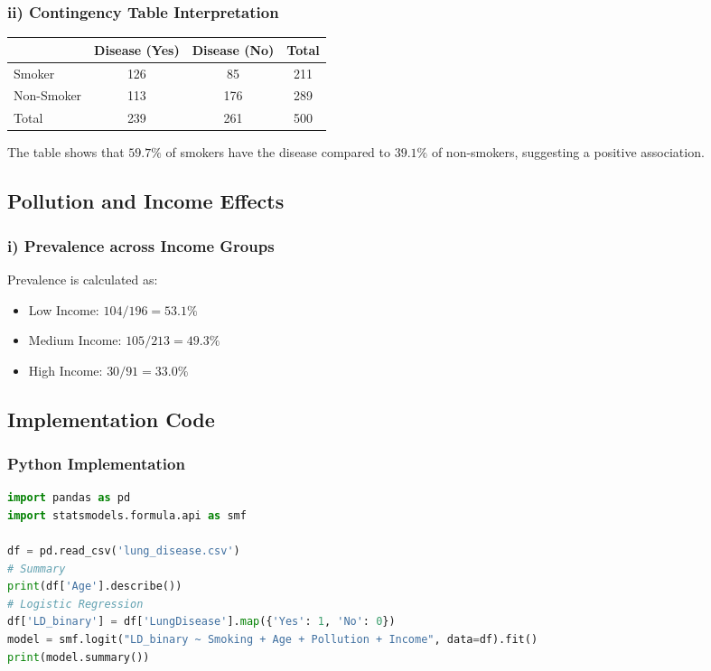 \documentclass[12pt, a4paper]{article}
\begin{document}
\subsubsection{ii) Contingency Table Interpretation}
\begin{table}[h!]
\centering
\begin{tabular}{@{}lccc@{}}
\toprule
 & Disease (Yes) & Disease (No) & Total \\ \midrule
Smoker & 126 & 85 & 211 \\
Non-Smoker & 113 & 176 & 289 \\ \midrule
Total & 239 & 261 & 500 \\ \bottomrule
\end{tabular}
\end{table}
The table shows that $59.7\%$ of smokers have the disease compared to $39.1\%$ of non-smokers, suggesting a positive association.

\subsection{Pollution and Income Effects}
\subsubsection{i) Prevalence across Income Groups}
Prevalence is calculated as:
\begin{itemize}
    \item Low Income: $104/196 = 53.1\%$
    \item Medium Income: $105/213 = 49.3\%$
    \item High Income: $30/91 = 33.0\%$
\end{itemize}

\subsection{Implementation Code}

\subsubsection{Python Implementation}
\begin{lstlisting}[language=Python]
import pandas as pd
import statsmodels.formula.api as smf

df = pd.read_csv('lung_disease.csv')
# Summary
print(df['Age'].describe())
# Logistic Regression
df['LD_binary'] = df['LungDisease'].map({'Yes': 1, 'No': 0})
model = smf.logit("LD_binary ~ Smoking + Age + Pollution + Income", data=df).fit()
print(model.summary())
\end{lstlisting}
\end{document}
